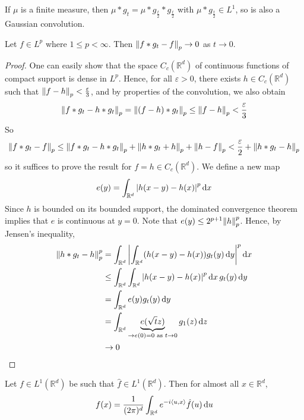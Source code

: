 \begin{remark}
	If \( \mu \) is a finite measure, then \( \mu \ast g_t = \mu \ast g_{\frac{t}{2}} \ast g_{\frac{t}{2}} \) with \( \mu \ast g_{\frac{t}{2}} \in L^1 \), so is also a Gaussian convolution.
\end{remark}
\begin{lemma}
	Let \( f \in L^p \) where \( 1 \leq p < \infty \).
	Then \( \norm{f \ast g_t - f}_p \to 0 \) as \( t \to 0 \).
\end{lemma}
\begin{proof}
	One can easily show that the space \( C_c(\mathbb R^d) \) of continuous functions of compact support is dense in \( L^p \).
	Hence, for all \( \varepsilon > 0 \), there exists \( h \in C_c(\mathbb R^d) \) such that \( \norm{f - h}_p < \frac{\varepsilon}{3} \), and by properties of the convolution, we also obtain
	\[ \norm{f \ast g_t - h \ast g_t}_p = \norm{(f - h) \ast g_t}_p \leq \norm{f - h}_p < \frac{\varepsilon}{3} \]
	So
	\[ \norm{f \ast g_t - f}_p \leq \norm{f \ast g_t - h \ast g_t}_p + \norm{h \ast g_t + h}_p + \norm{h - f}_p < \frac{\varepsilon}{2} + \norm{h \ast g_t - h}_p \]
	so it suffices to prove the result for \( f = h \in C_c(\mathbb R^d) \).
	We define a new map
	\[ e(y) = \int_{\mathbb R^d} \abs{h(x-y) - h(x)}^p \dd{x} \]
	Since \( h \) is bounded on its bounded support, the dominated convergence theorem implies that \( e \) is continuous at \( y = 0 \).
	Note that \( e(y) \leq 2^{p+1} \norm{h}_p^p \).
	Hence, by Jensen's inequality,
	\begin{align*}
		\norm{h \ast g_t - h}_p^p &= \int_{\mathbb R^d} \abs{ \int_{\mathbb R^d} (h(x-y) - h(x)) g_t(y) \dd{y} }^p \dd{x} \\
		&\leq \int_{\mathbb R^d} \int_{\mathbb R^d} \abs{h(x-y) - h(x)}^p \dd{x} g_t(y) \dd{y} \\
		&= \int_{\mathbb R^d} e(y) g_t(y) \dd{y} \\
		&= \int_{\mathbb R^d} \underbrace{e(\sqrt{t} z)}_{\to e(0) = 0 \text{ as } t \to 0} g_1(z) \dd{z} \\
		&\to 0
	\end{align*}
\end{proof}
\begin{theorem}
	Let \( f \in L^1(\mathbb R^d) \) be such that \( \hat f \in L^1(\mathbb R^d) \).
	Then for almost all \( x \in \mathbb R^d \),
	\[ f(x) = \frac{1}{(2\pi)^d} \int_{\mathbb R^d} e^{-i\left\langle{u,x}\right\rangle} \hat f(u) \dd{u} \]
\end{theorem}
